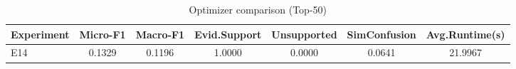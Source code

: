 \begin{table}[t]
\centering
\caption{Optimizer comparison (Top-50)}
\label{tab:opt}
\begin{tabular}{lcccccc}
\toprule
Experiment & Micro-F1 & Macro-F1 & Evid.Support & Unsupported & SimConfusion & Avg.Runtime(s) \\
\midrule
E14 & 0.1329 & 0.1196 & 1.0000 & 0.0000 & 0.0641 & 21.9967 \\
\bottomrule
\end{tabular}
\end{table}
